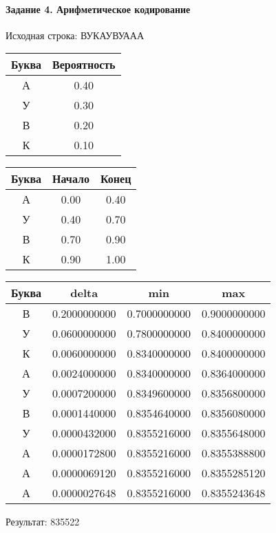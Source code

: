 \documentclass[a4paper, 12pt]{article}
\begin{document}
\paragraph{Задание 4. Арифметическое кодирование\\}

Исходная строка: ВУКАУВУААА\
\begin{center}
 \begin{tabular}{ |c|c| } 
  \hline
     Буква & Вероятность \\ \hline
А & 0.40\\\hline
У & 0.30\\\hline
В & 0.20\\\hline
К & 0.10
\\ \hline \end{tabular}
\end{center}
\begin{center}
 \begin{tabular}{ |c|c|c| } 
  \hline
     Буква & Начало & Конец \\ \hline
А & 0.00 & 0.40\\\hline
У & 0.40 & 0.70\\\hline
В & 0.70 & 0.90\\\hline
К & 0.90 & 1.00
\\ \hline \end{tabular}
\end{center}
\begin{center}
 \begin{tabular}{ |c|c|c|c| } 
  \hline
     Буква & delta & min & max \\ \hline
В & 0.2000000000 & 0.7000000000 & 0.9000000000\\\hline
У & 0.0600000000 & 0.7800000000 & 0.8400000000\\\hline
К & 0.0060000000 & 0.8340000000 & 0.8400000000\\\hline
А & 0.0024000000 & 0.8340000000 & 0.8364000000\\\hline
У & 0.0007200000 & 0.8349600000 & 0.8356800000\\\hline
В & 0.0001440000 & 0.8354640000 & 0.8356080000\\\hline
У & 0.0000432000 & 0.8355216000 & 0.8355648000\\\hline
А & 0.0000172800 & 0.8355216000 & 0.8355388800\\\hline
А & 0.0000069120 & 0.8355216000 & 0.8355285120\\\hline
А & 0.0000027648 & 0.8355216000 & 0.8355243648
\\ \hline \end{tabular}
\end{center}
Результат: 835522
\pagebreak
\end{document}
